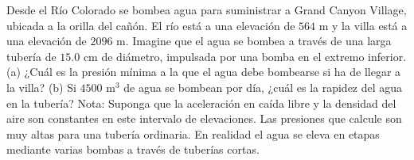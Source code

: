 \item Desde el Río Colorado se bombea agua para suministrar a Grand Canyon Village, ubicada a la orilla del cañón. El río está a una elevación de $564 \text{ m}$ y la villa está a una elevación de $2096 \text{ m}$. Imagine que el agua se bombea a través de una larga tubería de $15.0 \text{ cm}$ de diámetro, impulsada por una bomba en el extremo inferior. (a) ¿Cuál es la presión mínima a la que el agua debe bombearse si ha de llegar a la villa? (b) Si $4500 \text{ m}^3$ de agua se bombean por día, ¿cuál es la rapidez del agua en la tubería? Nota: Suponga que la aceleración en caída libre y la densidad del aire son constantes en este intervalo de elevaciones. Las presiones que calcule son muy altas para una tubería ordinaria. En realidad el agua se eleva en etapas mediante varias bombas a través de tuberías cortas.
